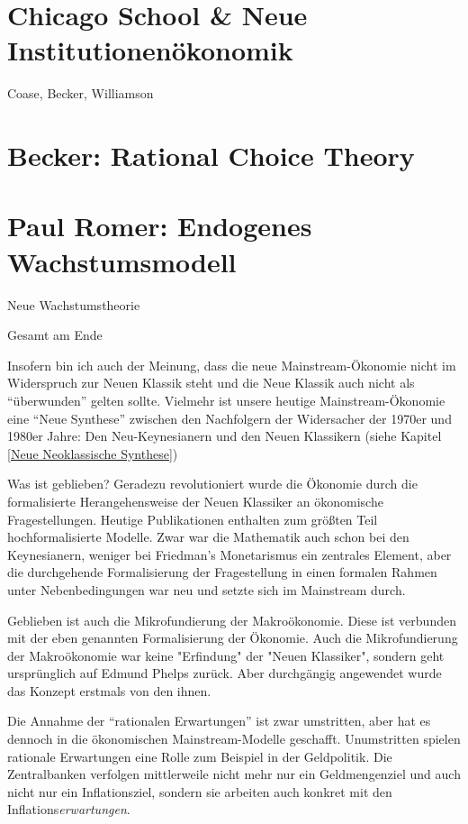 \section{Chicago School \& Neue Institutionenökonomik}
Coase, Becker, Williamson 

\section{Becker: Rational Choice Theory}




\section{Paul Romer: Endogenes Wachstumsmodell} Neue Wachstumstheorie









Gesamt am Ende



Insofern bin ich auch der Meinung, dass die neue Mainstream-Ökonomie nicht im Widerspruch zur Neuen Klassik steht und die Neue Klassik auch nicht als "`überwunden"' gelten sollte. Vielmehr ist unsere heutige Mainstream-Ökonomie eine "`Neue Synthese"' zwischen den Nachfolgern der Widersacher der 1970er und 1980er Jahre: Den Neu-Keynesianern und den Neuen Klassikern (siehe Kapitel \ref{Neue Neoklassische Synthese})


Was ist geblieben? Geradezu revolutioniert wurde die Ökonomie durch die formalisierte Herangehensweise der Neuen Klassiker an ökonomische Fragestellungen. Heutige Publikationen enthalten zum größten Teil hochformalisierte Modelle. Zwar war die Mathematik auch schon bei den Keynesianern, weniger bei Friedman's Monetarismus ein zentrales Element, aber die durchgehende Formalisierung der Fragestellung in einen formalen Rahmen unter Nebenbedingungen war neu und setzte sich im Mainstream durch.

Geblieben ist auch die Mikrofundierung der Makroökonomie. Diese ist verbunden mit der eben genannten Formalisierung der Ökonomie. Auch die Mikrofundierung der Makroökonomie war keine "Erfindung" der "Neuen Klassiker", sondern geht ursprünglich auf Edmund Phelps zurück. Aber durchgängig angewendet wurde das Konzept erstmals von den ihnen.

Die Annahme der "`rationalen Erwartungen"' ist zwar umstritten, aber hat es dennoch in die ökonomischen Mainstream-Modelle geschafft. Unumstritten spielen rationale Erwartungen eine Rolle zum Beispiel in der Geldpolitik. Die Zentralbanken verfolgen mittlerweile nicht mehr nur ein Geldmengenziel und auch nicht nur ein Inflationsziel, sondern sie arbeiten auch konkret mit den Inflations\textit{erwartungen}.


